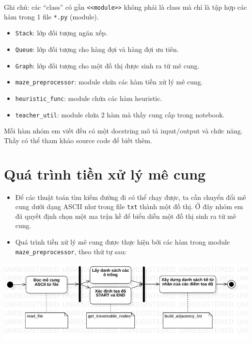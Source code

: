 \documentclass{report}
\providecommand{\tightlist}{%
      \setlength{\itemsep}{0pt}\setlength{\parskip}{0pt}}
\begin{document}
Ghi chú: các ``class'' có gắn
\texttt{\textless{}\textless{}module\textgreater{}\textgreater{}} không
phải là class mà chỉ là tập hợp các hàm trong 1 file \texttt{*.py}
(module).

\begin{itemize}
\tightlist
\item
  \texttt{Stack}: lớp đối tượng ngăn xếp.
\item
  \texttt{Queue}: lớp đối tượng cho hàng đợi và hàng đợi ưu tiên.
\item
  \texttt{Graph}: lớp đối tượng cho một đồ thị được sinh ra từ mê cung.
\item
  \texttt{maze\_preprocessor}: module chứa các hàm tiền xử lý mê cung.
\item
  \texttt{heuristic\_func}: module chứa các hàm heuristic.
\item
  \texttt{teacher\_util}: module chứa 2 hàm mà thầy cung cấp trong
  notebook.
\end{itemize}

Mỗi hàm nhóm em viết đều có một docstring mô tả input/output và chức
năng. Thầy có thể tham khảo source code để biết thêm.

\hypertarget{quuxe1-truxecnh-tiux1ec1n-xux1eed-luxfd-muxea-cung}{%
\section{Quá trình tiền xử lý mê
cung}\label{quuxe1-truxecnh-tiux1ec1n-xux1eed-luxfd-muxea-cung}}

\begin{itemize}
\item
  Để các thuật toán tìm kiếm đường đi có thể chạy được, ta cần chuyển
  đổi mê cung dưới dạng ASCII như trong file \texttt{txt} thành một đồ
  thị. Ở đây nhóm em đã quyết định chọn một ma trận kề để biểu diễn một
  đồ thị sinh ra từ mê cung.
\item
  Quá trình tiền xử lý mê cung được thực hiện bởi các hàm trong module
  \texttt{maze\_preprocessor}, theo thứ tự sau:
\end{itemize}

\includegraphics{images/ActivityDiagram1.jpg}
\end{document}
